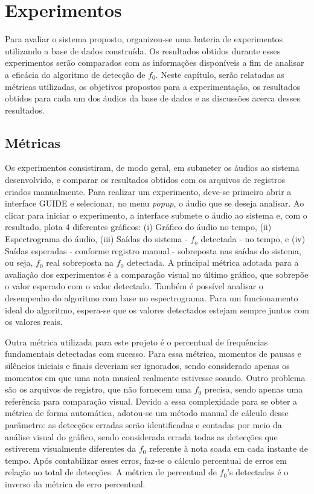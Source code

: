 \chapter{Experimentos} \label{cap4}

Para avaliar o sistema proposto, organizou-se uma bateria de experimentos utilizando a base de dados construída. Os resultados obtidos durante esses experimentos serão comparados com as informações disponíveis a fim de analisar a eficácia do algoritmo de detecção de $f_0$. Neste capítulo, serão relatadas as métricas utilizadas, os objetivos propostos para a experimentação, os resultados obtidos para cada um dos áudios da base de dados e as discussões acerca desses resultados.

\section{Métricas}


Os experimentos consistiram, de modo geral, em submeter os áudios ao sistema desenvolvido, e comparar os resultados obtidos com os arquivos de registros criados manualmente. Para realizar um experimento, deve-se primeiro abrir a interface GUIDE e selecionar, no menu \textit{popup}, o áudio que se deseja analisar. Ao clicar para iniciar o experimento, a interface submete o áudio ao sistema e, com o resultado, plota 4 diferentes gráficos: (i) Gráfico do áudio no tempo, (ii) Espectrograma do áudio, (iii) Saídas do sistema - $f_o$ detectada - no tempo, e (iv) Saídas esperadas - conforme registro manual - sobreposta nas saídas do sistema, ou seja, $f_0$ real sobreposta na $f_0$ detectada. A principal métrica adotada para a avaliação dos experimentos é a comparação visual no último gráfico, que sobrepõe o valor esperado com o valor detectado. Também é possível analisar o desempenho do algoritmo com base no espectrograma. Para um funcionamento ideal do algoritmo, espera-se que os valores detectados estejam sempre juntos com os valores reais.


Outra métrica utilizada para este projeto é o percentual de frequências fundamentais detectadas com sucesso. Para essa métrica, momentos de pausas e silêncios iniciais e finais deveriam ser ignorados, sendo considerado apenas os momentos em que uma nota musical realmente estivesse soando. Outro problema são os arquivos de registro, que não fornecem uma $f_0$ precisa, sendo apenas uma referência para comparação visual. Devido a essa complexidade para se obter a métrica de forma automática, adotou-se um método manual de cálculo desse parâmetro: as detecções erradas serão identificadas e contadas por meio da análise visual do gráfico, sendo considerada errada todas as detecções que estiverem visualmente diferentes da $f_0$ referente à nota soada em cada instante de tempo. Após contabilizar esses erros, faz-se o cálculo percentual de erros em relação ao total de detecções. A métrica de percentual de $f_0$'s detectadas é o inverso da métrica de erro percentual.


